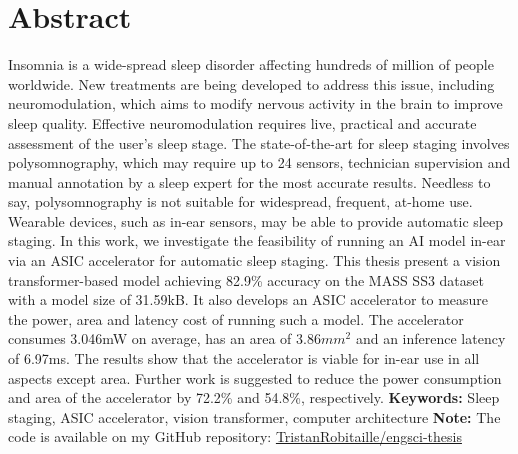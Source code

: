 \documentclass[12pt]{article}
\begin{document}



\maketitle



\onehalfspacing


\newpage

\section*{Abstract}
Insomnia is a wide-spread sleep disorder affecting hundreds of million of people worldwide. New treatments are being developed to address this issue, including neuromodulation,
which aims to modify nervous activity in the brain to improve sleep quality. Effective neuromodulation requires live, practical and accurate assessment of the user's sleep stage.
The state-of-the-art for sleep staging involves polysomnography, which may require up to 24 sensors, technician supervision and manual annotation by a sleep expert for the
most accurate results. Needless to say, polysomnography is not suitable for widespread, frequent, at-home use. Wearable devices, such as in-ear sensors, may be able to provide
automatic sleep staging. In this work, we investigate the feasibility of running an AI model in-ear via an ASIC accelerator for automatic sleep staging. This thesis present a vision
transformer-based model achieving 82.9\% accuracy on the MASS SS3 dataset with a model size of 31.59kB. It also develops an ASIC accelerator to measure the power, area and latency
cost of running such a model. The accelerator consumes 3.046mW on average, has an area of 3.86$mm^2$ and an inference latency of 6.97ms. The results show that the accelerator is 
viable for in-ear use in all aspects except area. Further work is suggested to reduce the power consumption and area of the accelerator by 72.2\% and 54.8\%, respectively.
\newline
\newline
{\bf Keywords:} Sleep staging, ASIC accelerator, vision transformer, computer architecture
\newline
\newline
{\bf Note:} The code is available on my GitHub repository: \href{https://github.com/TristanRobitaille/engsci-thesis}{TristanRobitaille/engsci-thesis}
\newpage
\end{document}
